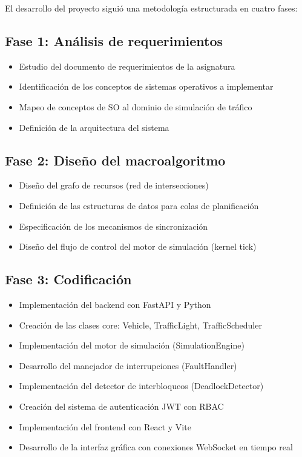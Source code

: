 \documentclass[12pt,a4paper]{article}
\begin{document}
El desarrollo del proyecto siguió una metodología estructurada en cuatro fases:

\subsection{Fase 1: Análisis de requerimientos}
\begin{itemize}
    \item Estudio del documento de requerimientos de la asignatura
    \item Identificación de los conceptos de sistemas operativos a implementar
    \item Mapeo de conceptos de SO al dominio de simulación de tráfico
    \item Definición de la arquitectura del sistema
\end{itemize}

\subsection{Fase 2: Diseño del macroalgoritmo}
\begin{itemize}
    \item Diseño del grafo de recursos (red de intersecciones)
    \item Definición de las estructuras de datos para colas de planificación
    \item Especificación de los mecanismos de sincronización
    \item Diseño del flujo de control del motor de simulación (kernel tick)
\end{itemize}

\subsection{Fase 3: Codificación}
\begin{itemize}
    \item Implementación del backend con FastAPI y Python
    \item Creación de las clases core: Vehicle, TrafficLight, TrafficScheduler
    \item Implementación del motor de simulación (SimulationEngine)
    \item Desarrollo del manejador de interrupciones (FaultHandler)
    \item Implementación del detector de interbloqueos (DeadlockDetector)
    \item Creación del sistema de autenticación JWT con RBAC
    \item Implementación del frontend con React y Vite
    \item Desarrollo de la interfaz gráfica con conexiones WebSocket en tiempo real
\end{itemize}
\end{document}
